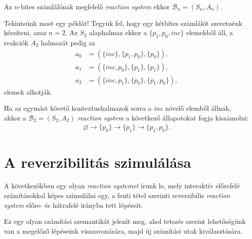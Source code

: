 \documentclass[12pt]{article}
\theoremstyle{definition}
\theoremstyle{remark}
\theoremstyle{plain}
\let\emptyset\varnothing
\begin{document}
    Az $n$-bites számlálónak megfelelő \textit{reaction system} ekkor $\mathcal{B}_{n}=(S_{n}, A_{n})$.

    Tekintsünk most egy példát! Tegyük fel, hogy egy kétbites számlálót szeretnénk készíteni, azaz $n = 2$. Az $S_{2}$ alaphalmaz ekkor a $\{p_{1}, p_{0}, \textit{inc}\}$ elemekből áll, a reakciók $A_{2}$ halmazát pedig az
    \begin{align*}
        a_{0} &= (\{ \textit{inc} \}, \{ p_{1}, p_{0} \}, \{ p_{0} \} ), \\
        a_{1} &= (\{ \textit{inc}, p_{0} \}, \{ p_{1} \}, \{ p_{1} \} ), \\
        a_{2} &= (\{ \textit{inc}, p_{1} \}, \{ p_{0} \}, \{ p_{1}, p_{0} \} ),
    \end{align*}
    elemek alkotják.

    Ha az egymást követő kontextushalmazok sorra a \textit{inc} növelő elemből állnak, akkor a $\mathcal{B}_{2} = (S_{2}, A_{2})$ \textit{reaction system} a következő állapotokat fogja kiszámolni:
    \begin{align*}
        \emptyset \rightarrow \{p_{0}\} \rightarrow \{p_{1}\} \rightarrow \{p_{1}, p_{0}\}.
    \end{align*}

    \section*{A reverzibilitás szimulálása}

    A következőkben egy olyan \textit{reaction systemet} írunk le, mely interaktív előrefelé számításokkal képes szimulálni egy, a fenti tétel szerinti reverzibilis \textit{reaction system} előre- és hátrafelé irányba tett lépéseit.

    Ez egy olyan számítási szemantikát jelenít meg, ahol tetszés szerint lehetőségünk van a megelőző lépéseink visszavonására, majd új számítási utak kiválasztására.
\end{document}
